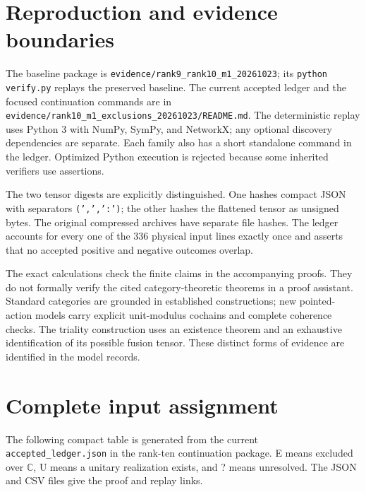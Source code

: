 \documentclass[11pt]{article}
\newcommand{\C}{\mathbb C}
\begin{document}








\section{Reproduction and evidence boundaries}
The baseline package is \nolinkurl{evidence/rank9_rank10_m1_20261023}; its
\nolinkurl{python verify.py} replays the preserved baseline. The current
accepted ledger and the focused continuation commands are in
\nolinkurl{evidence/rank10_m1_exclusions_20261023/README.md}. The deterministic replay uses Python 3 with NumPy, SymPy, and
NetworkX; any optional discovery dependencies are separate. Each family
also has a short standalone command in the ledger. Optimized Python
execution is rejected because some inherited verifiers use assertions.

The two tensor digests are explicitly distinguished. One hashes compact JSON
with separators \texttt{(',',':')}; the other hashes the flattened tensor as
unsigned bytes. The original compressed archives have separate file hashes.
The ledger accounts for every one of the 336 physical input lines exactly once
and asserts that no accepted positive and negative outcomes overlap.

The exact calculations check the finite claims in the accompanying proofs.
They do not formally verify the cited category-theoretic theorems in a proof
assistant. Standard categories are grounded in established constructions;
new pointed-action models carry explicit unit-modulus cochains and complete
coherence checks. The triality construction uses an existence theorem and
an exhaustive identification of its possible fusion tensor. These distinct
forms of evidence are identified in the model records.

\appendix
\section{Complete input assignment}
The following compact table is generated from the current
\nolinkurl{accepted_ledger.json} in the rank-ten continuation package.
E means excluded over $\C$, U means a unitary realization exists, and
? means unresolved. The JSON and CSV files give the proof and replay links.

\end{document}
